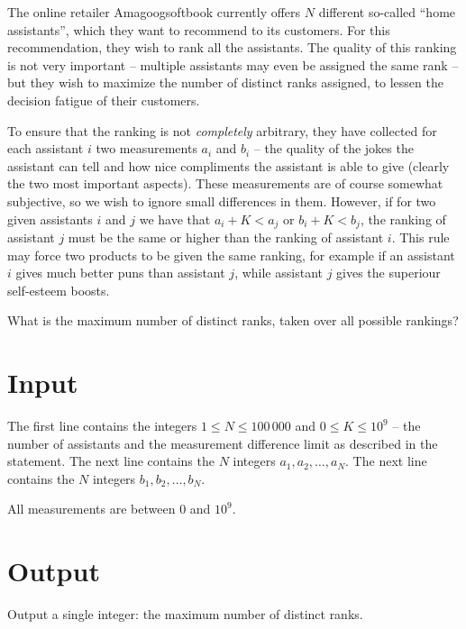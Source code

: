 The online retailer Amagoogsoftbook currently offers $N$ different so-called ``home assistants'', which they want to recommend to its customers.
For this recommendation, they wish to rank all the assistants.
The quality of this ranking is not very important -- multiple assistants may even be assigned the same rank -- but they wish to maximize the number of distinct ranks assigned, to lessen the decision fatigue of their customers.

To ensure that the ranking is not \emph{completely} arbitrary, they have collected for each assistant $i$ two measurements $a_i$ and $b_i$ -- the quality of the jokes the assistant can tell and how nice compliments the assistant is able to give (clearly the two most important aspects).
These measurements are of course somewhat subjective, so we wish to ignore small differences in them.
However, if for two given assistants $i$ and $j$ we have that $a_i + K < a_j$ or $b_i + K < b_j$, the ranking of assistant $j$ must be the same or higher than the ranking of assistant $i$.
This rule may force two products to be given the same ranking, for example if an assistant $i$ gives much better puns than assistant $j$, while assistant $j$ gives the superiour self-esteem boosts.

What is the maximum number of distinct ranks, taken over all possible rankings?

\section*{Input}
The first line contains the integers $1 \le N \le 100\,000$ and $0 \le K \le 10^9$ -- the number of assistants and the measurement difference limit as described in the statement.
The next line contains the $N$ integers $a_1, a_2, \dots, a_N$.
The next line contains the $N$ integers $b_1, b_2, \dots, b_N$.

All measurements are between $0$ and $10^9$.

\section*{Output}
Output a single integer: the maximum number of distinct ranks.
